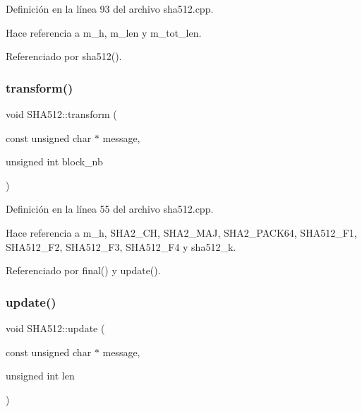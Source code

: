 Definición en la línea 93 del archivo sha512.\+cpp.



Hace referencia a m\+\_\+h, m\+\_\+len y m\+\_\+tot\+\_\+len.



Referenciado por sha512().

\hypertarget{classSHA512_aaa6717d3ffe1b8efa2d17b838276ab29}{}\label{classSHA512_aaa6717d3ffe1b8efa2d17b838276ab29} 
\subsubsection{\texorpdfstring{transform()}{transform()}}
{\footnotesize\ttfamily void S\+H\+A512\+::transform (\begin{DoxyParamCaption}\item[{const unsigned char $\ast$}]{message,  }\item[{unsigned int}]{block\+\_\+nb }\end{DoxyParamCaption})\hspace{0.3cm}{\ttfamily [protected]}}



Definición en la línea 55 del archivo sha512.\+cpp.



Hace referencia a m\+\_\+h, S\+H\+A2\+\_\+\+CH, S\+H\+A2\+\_\+\+M\+AJ, S\+H\+A2\+\_\+\+P\+A\+C\+K64, S\+H\+A512\+\_\+\+F1, S\+H\+A512\+\_\+\+F2, S\+H\+A512\+\_\+\+F3, S\+H\+A512\+\_\+\+F4 y sha512\+\_\+k.



Referenciado por final() y update().

\hypertarget{classSHA512_aa1c4c23e601cbc51deda2fecbfed71d6}{}\label{classSHA512_aa1c4c23e601cbc51deda2fecbfed71d6} 
\subsubsection{\texorpdfstring{update()}{update()}}
{\footnotesize\ttfamily void S\+H\+A512\+::update (\begin{DoxyParamCaption}\item[{const unsigned char $\ast$}]{message,  }\item[{unsigned int}]{len }\end{DoxyParamCaption})}



